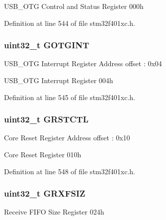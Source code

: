 U\+S\+B\+\_\+\+O\+TG Control and Status Register 000h 

Definition at line 544 of file stm32f401xc.\+h.

\subsubsection[{\texorpdfstring{G\+O\+T\+G\+I\+NT}{GOTGINT}}]{ uint32\+\_\+t G\+O\+T\+G\+I\+NT}\hypertarget{struct_u_s_b___o_t_g___global_type_def_aef613e58417a7201da95b89b85931da9}{}\label{struct_u_s_b___o_t_g___global_type_def_aef613e58417a7201da95b89b85931da9}
U\+S\+B\+\_\+\+O\+TG Interrupt Register Address offset \+: 0x04

U\+S\+B\+\_\+\+O\+TG Interrupt Register 004h 

Definition at line 545 of file stm32f401xc.\+h.

\subsubsection[{\texorpdfstring{G\+R\+S\+T\+C\+TL}{GRSTCTL}}]{ uint32\+\_\+t G\+R\+S\+T\+C\+TL}\hypertarget{struct_u_s_b___o_t_g___global_type_def_aecf297022669fda29294f6fe9818ebbd}{}\label{struct_u_s_b___o_t_g___global_type_def_aecf297022669fda29294f6fe9818ebbd}
Core Reset Register Address offset \+: 0x10

Core Reset Register 010h 

Definition at line 548 of file stm32f401xc.\+h.

\subsubsection[{\texorpdfstring{G\+R\+X\+F\+S\+IZ}{GRXFSIZ}}]{ uint32\+\_\+t G\+R\+X\+F\+S\+IZ}\hypertarget{struct_u_s_b___o_t_g___global_type_def_a1140b76ff103608f66c26ad0a3d595d0}{}\label{struct_u_s_b___o_t_g___global_type_def_a1140b76ff103608f66c26ad0a3d595d0}
Receive F\+I\+FO Size Register 024h 

